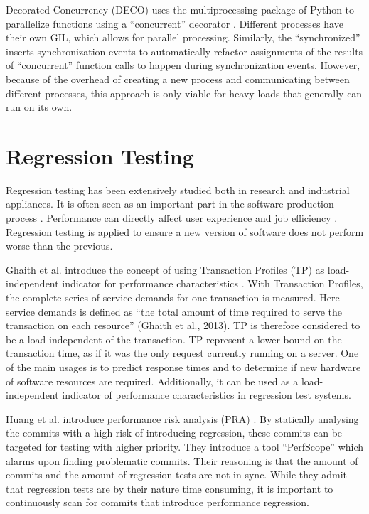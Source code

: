 Decorated Concurrency (DECO) uses the multiprocessing package of Python to parallelize functions using a ``concurrent'' decorator \cite{sherman2016deco}.
Different processes have their own GIL, which allows for parallel processing.
Similarly, the ``synchronized''  inserts synchronization events to automatically refactor assignments of the results of ``concurrent'' function calls to happen during synchronization events.
However, because of the overhead of creating a new process and communicating between different processes, this approach is only viable for heavy loads that generally can run on its own.

\section{Regression Testing}
Regression testing has been extensively studied both in research and industrial appliances.
It is often seen as an important part in the software production process \cite{ghaith2013profile}.
Performance can directly affect user experience and job efficiency \cite{huang2014performance}.
Regression testing is applied to ensure a new version of software does not perform worse than the previous.

Ghaith et al. introduce the concept of using Transaction Profiles (TP) as load-independent indicator for performance characteristics \cite{ghaith2013profile}. 
With Transaction Profiles, the complete series of service demands for one transaction is measured.
Here service demands is defined as \enquote{the total amount of time required to serve the transaction
on each resource} (Ghaith et al., 2013).
TP is therefore considered to be a load-independent of the transaction.
TP represent a lower bound on the transaction time, as if it was the only request currently running on a server.
One of the main usages is to predict response times and to determine if new hardware of software resources are required.
Additionally, it can be used as a load-independent indicator of performance characteristics in regression test systems.

Huang et al. introduce performance risk analysis (PRA) \cite{huang2014performance}.
By statically analysing the commits with a high risk of introducing regression, these commits can be targeted for testing with higher priority.
They introduce a tool \enquote{PerfScope} which alarms upon finding problematic commits.
Their reasoning is that the amount of commits and the amount of regression tests are not in sync.
While they admit that regression tests are by their nature time consuming, it is important to continuously scan for commits that introduce performance regression.


